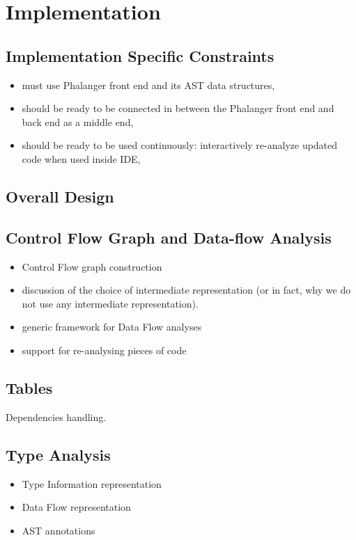 \chapter{Implementation}

    \section{Implementation Specific Constraints}
        \begin{itemize}
            \item must use Phalanger front end and its AST data structures,
            \item should be ready to be connected in between the Phalanger front end and back end as a middle end,
            \item should be ready to be used continuously: interactively re-analyze updated code when used inside IDE,
        \end{itemize}    
    
    \section{Overall Design}
    
    \section{Control Flow Graph and Data-flow Analysis}
        \begin{itemize}
            \item Control Flow graph construction
            \item discussion of the choice of intermediate representation (or in fact, why we do not use any intermediate representation).
            \item generic framework for Data Flow analyses
            \item support for re-analysing pieces of code
        \end{itemize}    
    
    \section{Tables}
        Dependencies handling. 
    
    \section{Type Analysis}
        \begin{itemize}
            \item Type Information representation
            \item Data Flow representation
            \item AST annotations
        \end{itemize}
